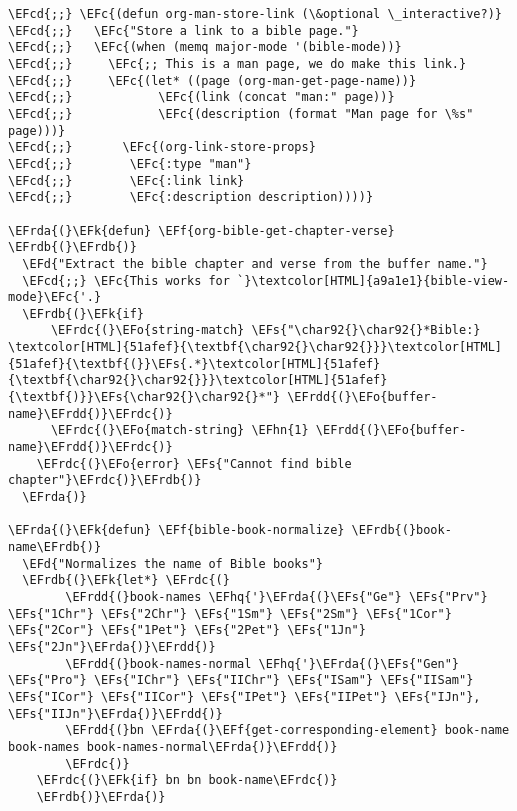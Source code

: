 \documentclass[a4wide,10pt]{article}
\newcommand{\EFc}[1]{\textcolor{EFc}{#1}} %
\newcommand{\EFcd}[1]{\textcolor{EFcd}{#1}} %
\newcommand{\EFs}[1]{\textcolor{EFs}{#1}} %
\newcommand{\EFd}[1]{\textcolor{EFd}{#1}} %
\newcommand{\EFk}[1]{\textcolor{EFk}{#1}} %
\newcommand{\EFf}[1]{\textcolor{EFf}{#1}} %
\newcommand{\EFo}[1]{\textcolor{EFo}{#1}} %
\newcommand{\EFhn}[1]{\textcolor{EFhn}{\textbf{#1}}} %
\newcommand{\EFhq}[1]{\textcolor{EFhq}{#1}} %
\newcommand{\EFrda}[1]{\textcolor{EFrda}{#1}} %
\newcommand{\EFrdb}[1]{\textcolor{EFrdb}{#1}} %
\newcommand{\EFrdc}[1]{\textcolor{EFrdc}{#1}} %
\newcommand{\EFrdd}[1]{\textcolor{EFrdd}{#1}} %
\begin{document}
\begin{Code}
\begin{Verbatim}
\EFcd{;;} \EFc{(defun org-man-store-link (\&optional \_interactive?)}
\EFcd{;;}   \EFc{"Store a link to a bible page."}
\EFcd{;;}   \EFc{(when (memq major-mode '(bible-mode))}
\EFcd{;;}     \EFc{;; This is a man page, we do make this link.}
\EFcd{;;}     \EFc{(let* ((page (org-man-get-page-name))}
\EFcd{;;}            \EFc{(link (concat "man:" page))}
\EFcd{;;}            \EFc{(description (format "Man page for \%s" page)))}
\EFcd{;;}       \EFc{(org-link-store-props}
\EFcd{;;}        \EFc{:type "man"}
\EFcd{;;}        \EFc{:link link}
\EFcd{;;}        \EFc{:description description))))}

\EFrda{(}\EFk{defun} \EFf{org-bible-get-chapter-verse} \EFrdb{(}\EFrdb{)}
  \EFd{"Extract the bible chapter and verse from the buffer name."}
  \EFcd{;;} \EFc{This works for `}\textcolor[HTML]{a9a1e1}{bible-view-mode}\EFc{'.}
  \EFrdb{(}\EFk{if}
      \EFrdc{(}\EFo{string-match} \EFs{"\char92{}\char92{}*Bible:} \textcolor[HTML]{51afef}{\textbf{\char92{}\char92{}}}\textcolor[HTML]{51afef}{\textbf{(}}\EFs{.*}\textcolor[HTML]{51afef}{\textbf{\char92{}\char92{}}}\textcolor[HTML]{51afef}{\textbf{)}}\EFs{\char92{}\char92{}*"} \EFrdd{(}\EFo{buffer-name}\EFrdd{)}\EFrdc{)}
      \EFrdc{(}\EFo{match-string} \EFhn{1} \EFrdd{(}\EFo{buffer-name}\EFrdd{)}\EFrdc{)}
    \EFrdc{(}\EFo{error} \EFs{"Cannot find bible chapter"}\EFrdc{)}\EFrdb{)}
  \EFrda{)}

\EFrda{(}\EFk{defun} \EFf{bible-book-normalize} \EFrdb{(}book-name\EFrdb{)}
  \EFd{"Normalizes the name of Bible books"}
  \EFrdb{(}\EFk{let*} \EFrdc{(}
        \EFrdd{(}book-names \EFhq{'}\EFrda{(}\EFs{"Ge"} \EFs{"Prv"} \EFs{"1Chr"} \EFs{"2Chr"} \EFs{"1Sm"} \EFs{"2Sm"} \EFs{"1Cor"} \EFs{"2Cor"} \EFs{"1Pet"} \EFs{"2Pet"} \EFs{"1Jn"} \EFs{"2Jn"}\EFrda{)}\EFrdd{)}
        \EFrdd{(}book-names-normal \EFhq{'}\EFrda{(}\EFs{"Gen"} \EFs{"Pro"} \EFs{"IChr"} \EFs{"IIChr"} \EFs{"ISam"} \EFs{"IISam"} \EFs{"ICor"} \EFs{"IICor"} \EFs{"IPet"} \EFs{"IIPet"} \EFs{"IJn"}, \EFs{"IIJn"}\EFrda{)}\EFrdd{)}
        \EFrdd{(}bn \EFrda{(}\EFf{get-corresponding-element} book-name book-names book-names-normal\EFrda{)}\EFrdd{)}
        \EFrdc{)}
    \EFrdc{(}\EFk{if} bn bn book-name\EFrdc{)}
    \EFrdb{)}\EFrda{)}


\end{Verbatim}
\end{Code}
\end{document}
